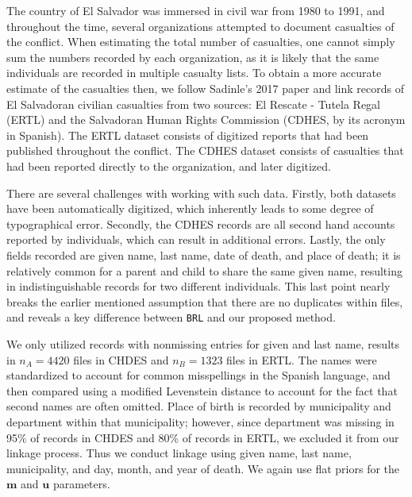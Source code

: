 \documentclass[12pt,letterpaper]{article}
\newcommand{\1}[1]{\mathbb{I}\!\left[#1\right]} %
\begin{document}
The country of El Salvador was immersed in civil war from 1980 to 1991,
and throughout the time, several organizations attempted to document
casualties of the conflict. When estimating the total number of
casualties, one cannot simply sum the numbers recorded by each
organization, as it is likely that the same individuals are recorded in
multiple casualty lists. To obtain a more accurate estimate of the
casualties then, we follow Sadinle's 2017 paper and link records of El
Salvadoran civilian casualties from two sources: El Rescate - Tutela
Regal (ERTL) and the Salvadoran Human Rights Commission (CDHES, by its
acronym in Spanish). The ERTL dataset consists of digitized reports that
had been published throughout the conflict. The CDHES dataset consists
of casualties that had been reported directly to the organization, and
later digitized.

There are several challenges with working with such data. Firstly, both
datasets have been automatically digitized, which inherently leads to
some degree of typographical error. Secondly, the CDHES records are all
second hand accounts reported by individuals, which can result in
additional errors. Lastly, the only fields recorded are given name, last
name, date of death, and place of death; it is relatively common for a
parent and child to share the same given name, resulting in
indistinguishable records for two different individuals. This last point
nearly breaks the earlier mentioned assumption that there are no
duplicates within files, and reveals a key difference between
\texttt{BRL} and our proposed method.

We only utilized records with nonmissing entries for given and last
name, results in \(n_A = 4420\) files in CHDES and \(n_B = 1323\) files
in ERTL. The names were standardized to account for common misspellings
in the Spanish language, and then compared using a modified Levenstein
distance to account for the fact that second names are often omitted.
Place of birth is recorded by municipality and department within that
municipality; however, since department was missing in 95\% of records
in CHDES and 80\% of records in ERTL, we excluded it from our linkage
process. Thus we conduct linkage using given name, last name,
municipality, and day, month, and year of death. We again use flat
priors for the \(\mathbf{m}\) and \(\mathbf{u}\) parameters.
\end{document}
